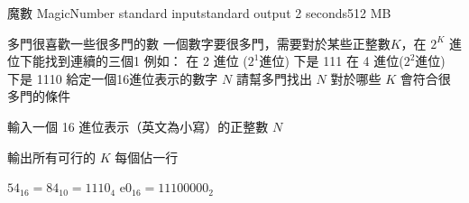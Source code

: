 \gdef\thisproblemauthor{}
\gdef\thisproblemdeveloper{}
\gdef\thisproblemorigin{}
\begin{problem}{魔數 MagicNumber}
{standard input}{standard output}
{2 seconds}{512 MB}{}

多門很喜歡一些很多門的數\newline
一個數字要很多門，需要對於某些正整數$K$，在 $2^K$ 進位下能找到連續的三個1\newline
\newline
例如： 在 2 進位 ($2^1$進位) 下是 111 在 4 進位($2^2$進位) 下是 1110\newline
\newline
給定一個16進位表示的數字 $N$\newline
請幫多門找出 $N$ 對於哪些 $K$ 會符合很多門的條件\newline

\InputFile

輸入一個 16 進位表示（英文為小寫）的正整數 $N$
\begin{iofmt}
\begin{itemize}
	\item $N \leq 16^{10^6}$
	\item 有 11 分的測試資料 $N \leq 16^5$
	\item 有 33 分的測試資料 $N \leq 16^{1000$
\end{itemize}
\end{iofmt}

\OutputFile

輸出所有可行的 $K$ \newline
每個佔一行

\Examples

\begin{example}
%
%
%
\end{example}
$54_{16} = 84_{10} = 1110_4$ \newline
$\textrm{e}0_{16} = 1110 0000_2$ \newline

\end{problem}
